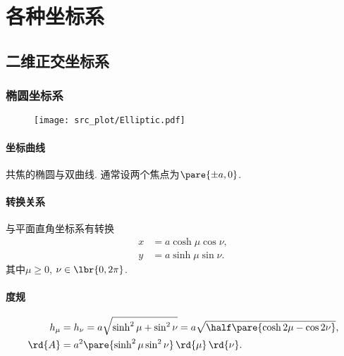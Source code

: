 \documentclass{article}
\begin{document}
\section{各种坐标系} %
\label{sec:各种坐标系}

\subsection{二维正交坐标系} %
\label{sub:二维正交坐标系}

\subsubsection{椭圆坐标系} %
\label{ssub:椭圆坐标系}

\begin{figure}[ht]
    \centering
    \texttt{[image: src\_plot/Elliptic.pdf]}
\end{figure}

\paragraph{坐标曲线} %
\label{par:坐标曲线}

共焦的椭圆与双曲线. 通常设两个焦点为$\pare{\pm a, 0}$.


\paragraph{转换关系} %
\label{par:转换关系}

与平面直角坐标系有转换
\begin{align*}
    x &= a\cosh \mu \cos \nu, \\
    y &= a\sinh \mu \sin \nu.
\end{align*}
其中$\mu \ge 0$, $\nu \in \lbr{0,2\pi}$.


\paragraph{度规} %
\label{par:度规}

\begin{align*}
    h_\mu &= h_\nu = a\sqrt{\sinh^2 \mu + \sin^2 \nu} = a\sqrt{\half \pare{\cosh 2\mu - \cos 2\nu}},\\ \rd{A} &= a^2\pare{\sinh^2\mu \sin^2\nu}\,\rd{\mu}\,\rd{\nu}.
\end{align*}
\end{document}
